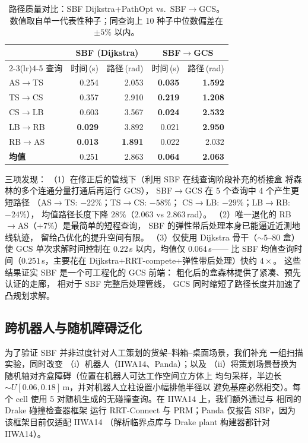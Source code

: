 \documentclass[journal]{IEEEtran}
\begin{document}
\begin{table}[ht]
\centering
\caption{路径质量对比：SBF Dijkstra+PathOpt vs.\ SBF$\to$GCS。数值取自单一代表性种子；同查询上 10 种子中位数偏差在 $\pm 5\%$ 以内。}
\label{tab:gcs_corridor}
\begin{tabular}{@{}l rr rr@{}}
\toprule
 & \multicolumn{2}{c}{\textbf{SBF (Dijkstra)}}
 & \multicolumn{2}{c}{\textbf{SBF$\to$GCS}} \\
\cmidrule(lr){2-3}\cmidrule(lr){4-5}
查询 & 时间\,(s) & 路径\,(rad) & 时间\,(s) & 路径\,(rad) \\
\midrule
AS$\to$TS & 0.254 & 2.053 & \textbf{0.035} & \textbf{1.592} \\
TS$\to$CS & 0.357 & 2.910 & \textbf{0.219} & \textbf{1.208} \\
CS$\to$LB & 0.603 & 3.567 & \textbf{0.024} & \textbf{2.532} \\
LB$\to$RB & \textbf{0.029} & 3.892 & 0.021 & \textbf{2.950} \\
RB$\to$AS & \textbf{0.013} & \textbf{1.891} & 0.022 & 2.032 \\
\midrule
\textbf{均值} & 0.251 & 2.863 & \textbf{0.064} & \textbf{2.063} \\
\bottomrule
\end{tabular}
\end{table}

三项发现：
（1）在修正后的管线下（利用 SBF 在线查询阶段补充的桥接盒
将森林的多个连通分量打通后再运行 GCS），
SBF$\to$GCS 在 5 个查询中 4 个产生更短路径
（AS$\to$TS: $-22\%$；TS$\to$CS: $-58\%$；
CS$\to$LB: $-29\%$；LB$\to$RB: $-24\%$），
均值路径长度下降 $28\%$（$2.063$ vs $2.863$\,rad）。
（2）唯一退化的 RB$\to$AS（$+7\%$）是最简单的短程查询，
SBF 的弹性带后处理本身已能逼近近测地线轨迹，
留给凸优化的提升空间有限。
（3）仅使用 Dijkstra 骨干（${\sim}5$--80 盒）
使 GCS 单次求解时间控制在 $0.22$\,s 以内，均值仅 $0.064$\,s——
比 SBF 均值查询时间（$0.251$\,s，主要花在
Dijkstra+RRT-compete+弹性带后处理）快约 $4\times$。
这些结果证实 SBF 是一个可工程化的 GCS 前端：
粗化后的盒森林提供了紧凑、预先认证的走廊，
相对于 SBF 完整后处理管线，
GCS 同时缩短了路径长度并加速了凸规划求解。

\subsection{跨机器人与随机障碍泛化}\label{sec:exp_randscenes}

为了验证 SBF 并非过度针对人工策划的货架--料箱--桌面场景，我们补充
一组扫描实验，同时改变
（i）机器人（IIWA14、Panda）；以及
（ii）将策划场景替换为随机轴对齐盒障碍（位置在机器人可达工作空间立方体上
均匀采样，半边长 $\sim U[0.06,0.18]$\,m，并对机器人立柱设置小幅排他半径以
避免基座必然相交）。每个 cell 使用 5 对随机生成的无碰撞查询。在 IIWA14
上，我们额外通过与  相同的 Drake 碰撞检查器框架
运行 RRT-Connect 与 PRM；Panda 仅报告 SBF，因为该框架目前仅适配 IIWA14
（解析临界点库与 Drake plant 构建器都针对 IIWA14）。
\end{document}
